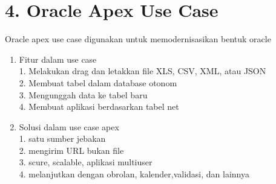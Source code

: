\section*{\normalsize 4. Oracle Apex Use Case}
Oracle apex use case digunakan untuk memodernisasikan bentuk oracle
\begin{enumerate}[label=\alph*.]
\item Fitur dalam use case\\
	1. Melakukan drag dan letakkan ﬁle XLS, CSV, XML, atau JSON\\
	2. Membuat tabel dalam database otonom\\
	3. Mengunggah data ke tabel baru\\
	4. Membuat aplikasi berdasarkan tabel net\\

\item Solusi dalam use case apex\\
	1. satu sumber jebakan\\
	2. mengirim URL bukan ﬁle\\
	3. scure, scalable, aplikasi multiuser\\
	4. melanjutkan dengan obrolan, kalender,validasi, dan lainnya\\
\end{enumerate}